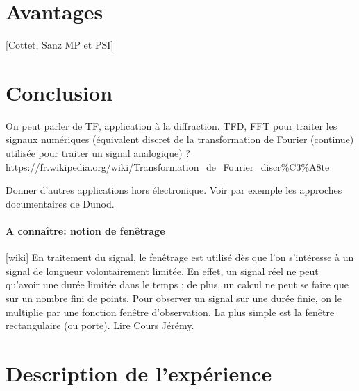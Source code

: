 \documentclass[11pt]{report}
\numberwithin{figure}{section}
\numberwithin{equation}{section}
\numberwithin{table}{section}
\newcommand{\1}{\boldsymbol{1}}
\begin{document}
\section{Avantages}

[Cottet, Sanz MP et PSI]

\section*{Conclusion}
  
On peut parler de TF, application à la diffraction. TFD, FFT pour traiter les signaux numériques (équivalent discret de la transformation de Fourier (continue) utilisée pour traiter un signal analogique) ? \url{https://fr.wikipedia.org/wiki/Transformation_de_Fourier_discr%C3%A8te}

Donner d'autres applications hors électronique. Voir par exemple les approches documentaires de Dunod.

\paragraph{A connaître: notion de fenêtrage} [wiki] En traitement du signal, le fenêtrage est utilisé dès que l'on s'intéresse à un signal de longueur volontairement limitée. En effet, un signal réel ne peut qu'avoir une durée limitée dans le temps ; de plus, un calcul ne peut se faire que sur un nombre fini de points. Pour observer un signal sur une durée finie, on le multiplie par une fonction fenêtre d'observation. La plus simple est la fenêtre rectangulaire (ou porte). Lire Cours Jérémy.

\section*{Description de l'expérience}
\end{document}
